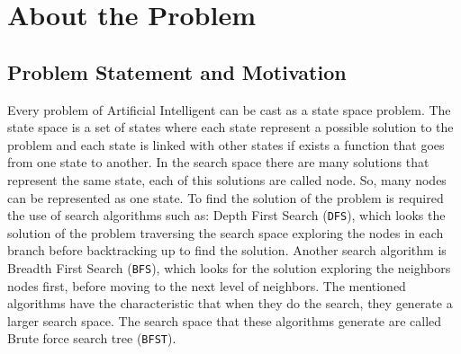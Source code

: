 

\chapter{About the Problem}\label{aboutTheProblem}


\section{Problem Statement and Motivation}

\noindent
Every problem of Artificial Intelligent can be cast as a state space problem. The state space is a set of states where each state represent a possible solution to the problem and each state is linked with other states if exists a function that goes from one state to another. In the search space there are many solutions that represent the same state, each of this solutions are called node. So, many nodes can be represented as one state. To find the solution of the problem is required the use of search algorithms such as: Depth First Search (\texttt{DFS}), which looks the solution of the problem traversing the search space exploring the nodes in each branch before backtracking up to find the solution. Another search algorithm is Breadth First Search (\texttt{BFS}), which looks for the solution exploring the neighbors nodes first, before moving to the next level of neighbors. The mentioned algorithms have the characteristic that when they do the search, they generate a larger search space. The search space that these algorithms generate are called Brute force search tree (\texttt{BFST}). \\

